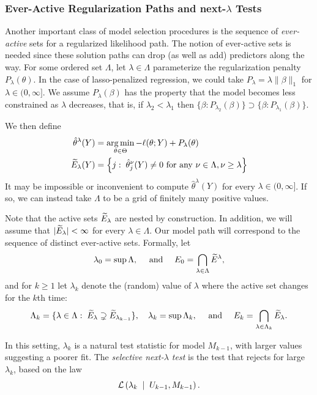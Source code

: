 \documentclass{article}
\begin{document}
\subsubsection{Ever-Active Regularization Paths and next-$\lambda$ Tests}
Another important class of model selection procedures is the sequence of {\em ever-active} sets for a regularized likelihood path. 
The notion of ever-active sets is needed since these solution paths can drop  (as well as add) predictors along the way. 	For some ordered set $\Lambda$, let $\lambda\in\Lambda$ parameterize the regularization penalty $P_\lambda(\theta)$. In the case of lasso-penalized regression, we could take $P_\lambda = \lambda\|\beta\|_1$ for $\lambda\in (0,\infty]$. 
We assume $P_\lambda(\beta)$  has the property  that the model becomes less constrained as $\lambda$ decreases, that is,
 if $\lambda_2<\lambda_1$ then $\{\beta:P_{\lambda_2}(\beta)\} \supset \{\beta:P_{\lambda_1}(\beta)\}$.  

We then define
\begin{align}
  \hat\theta^{\lambda}(Y) &= 
  \operatorname*{arg\,min}_{\theta\in\Theta} -\ell(\theta; Y) + P_\lambda(\theta) \\
  \widetilde{E}_\lambda(Y) &= \left\{j:\; \hat\theta_j^\nu(Y) \neq 0 
    \text{ for any } \nu\in \Lambda, \nu \geq \lambda \right\}
\end{align}
It may be impossible or inconvenient to compute $\hat\theta^\lambda(Y)$ for every $\lambda\in(0,\infty]$. If so, we can instead take $\Lambda$ to be a grid of finitely many positive values.

Note that the active sets $\widetilde{E}_\lambda$ are nested by construction. In addition, we will assume that $|\widetilde{E}_\lambda|<\infty$ for every $\lambda\in\Lambda$. Our model path will correspond to the sequence of distinct ever-active sets. 
Formally, let 
\[
\lambda_0=\sup \Lambda, \quad \text{ and } \quad 
E_0 = \bigcap_{\lambda\in \Lambda} \widetilde{E}^\lambda,
\]
and for $k\geq 1$ let $\lambda_k$ denote the (random) value of $\lambda$ where the active set changes for the $k$th time:
\begin{equation}
  \Lambda_k = \{\lambda\in \Lambda:\; \widetilde{E}_\lambda \supsetneq \widetilde{E}_{\lambda_{k-1}}\},
  \quad
  \lambda_k = \sup\Lambda_k,
  \quad \text{ and } \quad
  E_k = \bigcap_{\lambda\in\Lambda_k} \widetilde{E}_{\lambda}.
\end{equation}

In this setting, $\lambda_k$ is a natural test statistic for model $M_{k-1}$, with larger values suggesting a poorer fit. The {\em selective next-$\lambda$ test} is the test that rejects for large $\lambda_k$, based on the law
\begin{equation}
\mathcal{L}\left(\lambda_k \;\mid\; U_{k-1}, M_{k-1}\right).
\end{equation}
\end{document}
